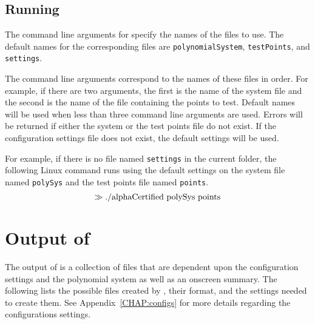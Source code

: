 \documentclass[11pt]{report}
\begin{document}
\subsection{Running \blueharvest}\label{SEC:Run}

The command line arguments for \blueharvestS specify the names
of the files to use.  The default names for the corresponding
files are {\tt polynomialSystem}, {\tt testPoints}, and {\tt settings}.

The command line arguments correspond to the names of these files in order.
For example, if there are two arguments, the first is the name of the
system file and the second is the name of the file containing the points to test.
Default names will be used when less than three command line arguments are used.
Errors will be returned if either the system or the
test points file do not exist.  If the configuration settings file does not exist,
the default settings will be used.

For example, if there is no file named {\tt settings} in the current folder,
the following Linux command runs \blueharvestS using the default settings
on the system file named {\tt polySys}
and the test points file named {\tt points}.
$$\gg \hbox{./alphaCertified polySys points}$$

\section{Output of \blueharvest}\label{CHAP:output}

The output of \blueharvestS is a collection of files that are dependent
upon the configuration settings and the polynomial system as well as an onscreen
summary.  The following lists the possible files created by \blueharvest,
their format, and the settings needed to create them.  See Appendix~\ref{CHAP:configs}
for more details regarding the configurations settings.
\end{document}
